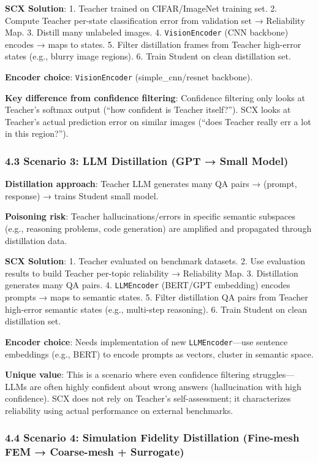 \documentclass[
  12pt,
]{article}
\begin{document}
\textbf{SCX Solution}: 1. Teacher trained on CIFAR/ImageNet training set. 2. Compute Teacher per-state classification error from validation set → Reliability Map. 3. Distill many unlabeled images. 4. \texttt{VisionEncoder} (CNN backbone) encodes → maps to states. 5. Filter distillation frames from Teacher high-error states (e.g., blurry image regions). 6. Train Student on clean distillation set.

\textbf{Encoder choice}: \texttt{VisionEncoder} (simple\_cnn/resnet backbone).

\textbf{Key difference from confidence filtering}: Confidence filtering only looks at Teacher's softmax output (``how confident is Teacher itself?''). SCX looks at Teacher's actual prediction error on similar images (``does Teacher really err a lot in this region?'').

\subsubsection{4.3 Scenario 3: LLM Distillation (GPT → Small Model)}\label{scenario-3-llm-distillation}

\textbf{Distillation approach}: Teacher LLM generates many QA pairs → (prompt, response) → trains Student small model.

\textbf{Poisoning risk}: Teacher hallucinations/errors in specific semantic subspaces (e.g., reasoning problems, code generation) are amplified and propagated through distillation data.

\textbf{SCX Solution}: 1. Teacher evaluated on benchmark datasets. 2. Use evaluation results to build Teacher per-topic reliability → Reliability Map. 3. Distillation generates many QA pairs. 4. \texttt{LLMEncoder} (BERT/GPT embedding) encodes prompts → maps to semantic states. 5. Filter distillation QA pairs from Teacher high-error semantic states (e.g., multi-step reasoning). 6. Train Student on clean distillation set.

\textbf{Encoder choice}: Needs implementation of new \texttt{LLMEncoder}---use sentence embeddings (e.g., BERT) to encode prompts as vectors, cluster in semantic space.

\textbf{Unique value}: This is a scenario where even confidence filtering struggles---LLMs are often highly confident about wrong answers (hallucination with high confidence). SCX does not rely on Teacher's self-assessment; it characterizes reliability using actual performance on external benchmarks.

\subsubsection{4.4 Scenario 4: Simulation Fidelity Distillation (Fine-mesh FEM → Coarse-mesh + Surrogate)}\label{scenario-4-simulation-fidelity-distillation}
\end{document}
